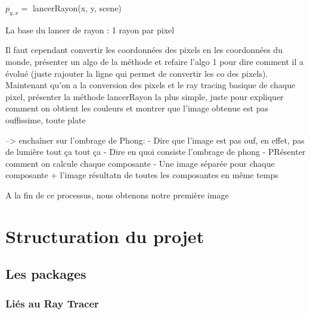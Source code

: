 \documentclass[11pt]{article}
\begin{document}
\begin {algorithm}
	\DontPrintSemicolon

	 {
		 {
			$p_{y, x} =$ lancerRayon(x, y, scene)
		}
	}

	\caption{La base du lancer de rayon : 1 rayon par pixel}
	\label{rayonParPixel}
\end {algorithm}

Il faut cependant convertir les coordonnées des pixels en les coordonnées du monde, présenter un algo de la méthode et refaire l'algo 1 pour dire comment il a évolué (juste rajouter la ligne qui permet de convertir les co des pixels). 
Maintenant qu'on a la conversion des pixels et le ray tracing basique de chaque pixel, présenter la méthode lancerRayon la plus simple, juste pour expliquer comment on obtient les couleurs et montrer que l'image obtenue est pas ouffissime, toute plate

--> enchaîner sur l'ombrage de Phong:
	- Dire que l'image est pas ouf, en effet, pas de lumière tout ça tout ça
	- Dire en quoi consiste l'ombrage de phong
	- PRésenter comment on calcule chaque composante
	- Une image séparée pour chaque composante + l'image résultatn de toutes les composantes en même temps

A la fin de ce processus, nous obtenons notre première image 

\section{Structuration du projet}
\subsection{Les packages}
\subsubsection{Liés au Ray Tracer}
\end{document}
